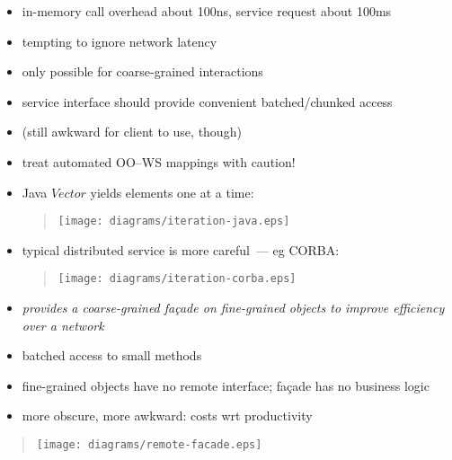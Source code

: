 \documentclass{sepslide-soa-faked} %
\begin{document}
\begin{slide}
\begin{itemize}
\item in-memory call overhead about 100ns, service request about 100ms
\item tempting to ignore network latency
\item only possible for coarse-grained interactions
\item service interface should provide convenient batched/chunked access
\item (still awkward for client to use, though)
\item treat automated OO--WS mappings with caution!
\end{itemize}
\end{slide}

\begin{slide}
\begin{itemize}
  \item Java $Vector$ yields elements one at a time:
  \begin{quote}
  \texttt{[image: diagrams/iteration-java.eps]}
  \end{quote}
  \item typical distributed service is more careful~--- eg CORBA:
  \begin{quote}
  \texttt{[image: diagrams/iteration-corba.eps]}
  \end{quote}
\end{itemize}
\end{slide}

\begin{slide}
\begin{itemize}
\item \emph{provides a coarse-grained fa\c cade on fine-grained objects to improve efficiency over a network}
  \medskip
\item batched access to small methods
\item fine-grained objects have no remote interface; fa\c cade has no business logic
\item more obscure, more awkward: costs wrt productivity
\end{itemize}
  \begin{quote}
  \texttt{[image: diagrams/remote-facade.eps]}
  \end{quote}
\end{slide}
\end{document}
